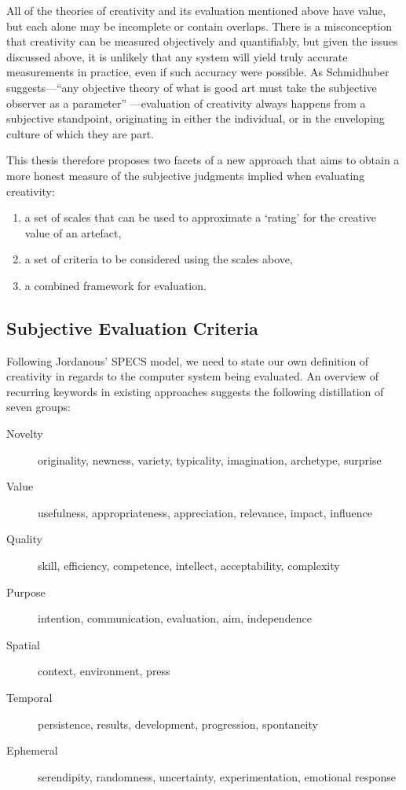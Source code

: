 All of the theories of creativity and its evaluation mentioned above have value, but each alone may be incomplete or contain overlaps. There is a misconception that creativity can be measured objectively and quantifiably, but given the issues discussed above, it is unlikely that any system will yield truly accurate measurements in practice, even if such accuracy were possible. As Schmidhuber suggests---``any objective theory of what is good art must take the subjective observer as a parameter'' \autocite*{Schmidhuber2006}---evaluation of creativity always happens from a subjective standpoint, originating in either the individual, or in the enveloping culture of which they are part.

This thesis therefore proposes two facets of a new approach that aims to obtain a more honest measure of the subjective judgments implied when evaluating creativity:

\begin{enumerate}
  \item a set of scales that can be used to approximate a `rating' for the creative value of an artefact,
  \item a set of criteria to be considered using the scales above,
  \item a combined framework for evaluation.
\end{enumerate}


\subsection{Subjective Evaluation Criteria}
\label{s:sec}

Following Jordanous' \ac{SPECS} model, we need to state our own definition of creativity in regards to the computer system being evaluated. An overview of recurring keywords in existing approaches suggests the following distillation of seven groups:

\begin{description}
  \item [Novelty] originality, newness, variety, typicality, imagination, archetype, surprise
  \item [Value] usefulness, appropriateness, appreciation, relevance, impact, influence
  \item [Quality] skill, efficiency, competence, intellect, acceptability, complexity
  \item [Purpose] intention, communication, evaluation, aim, independence
  \item [Spatial] context, environment, press
  \item [Temporal] persistence, results, development, progression, spontaneity
  \item [Ephemeral] serendipity, randomness, uncertainty, experimentation, emotional response
\end{description}

